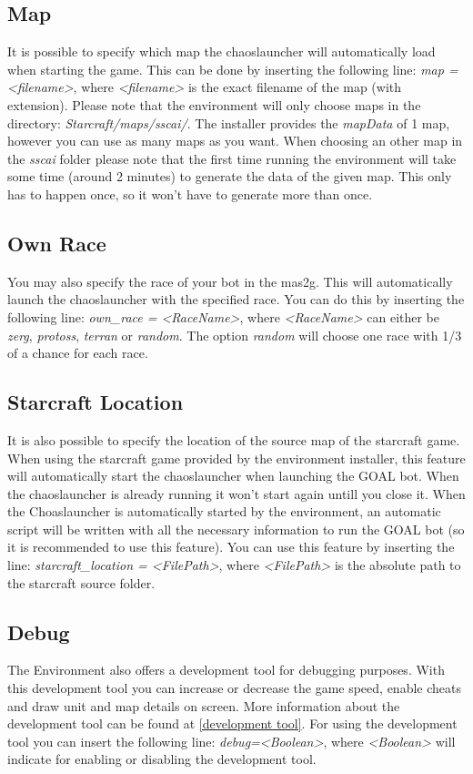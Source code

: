 \subsection{Map}
\label{map}
It is possible to specify which map the chaoslauncher will automatically load when starting the game. This can be done by inserting the following line: \textit{map = <filename>}, where \textit{<filename>} is the exact filename of the map (with extension). Please note that the environment will only choose maps in the directory: \textit{Starcraft/maps/sscai/}. The installer provides the \textit{mapData} of 1 map, however you can use as many maps as you want. When choosing an other map in the \textit{sscai} folder please note that the first time running the environment will take some time (around 2 minutes) to generate the data of the given map. This only has to happen once, so it won't have to generate more than once.

\subsection{Own Race}
\label{own race}
You may also specify the race of your bot in the mas2g. This will automatically launch the chaoslauncher with the specified race. You can do this by inserting the following line: \textit{own\_race = <RaceName>}, where \textit{<RaceName>} can either be \textit{zerg}, \textit{protoss}, \textit{terran} or \textit{random}. The option \textit{random} will choose one race with 1/3 of a chance for each race. 

\subsection{Starcraft Location}
\label{starcraft location}
It is also possible to specify the location of the source map of the starcraft game. When using the starcraft game provided by the environment installer, this feature will automatically start the chaoslauncher when launching the GOAL bot. When the chaoslauncher is already running it won't start again untill you close it. When the Choaslauncher is automatically started by the environment, an automatic script will be written with all the necessary information to run the GOAL bot (so it is recommended to use this feature). You can use this feature by inserting the line: \textit{starcraft\_location = <FilePath>}, where \textit{<FilePath>} is the absolute path to the starcraft source folder.

\subsection{Debug}
\label{debug}
The Environment also offers a development tool for debugging purposes. With this development tool you can increase or decrease the game speed, enable cheats and draw unit and map details on screen. More information about the development tool can be found at \ref{development tool}. For using the development tool you can insert the following line: \textit{debug=<Boolean>}, where \textit{<Boolean>} will indicate for enabling or disabling the development tool.

